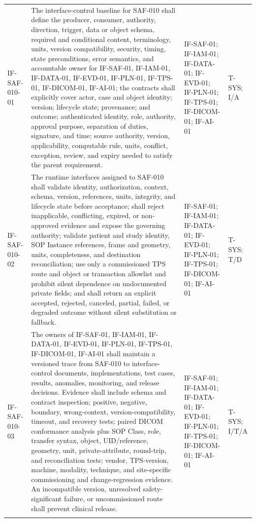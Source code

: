\documentclass[11pt,letterpaper]{article}
\begin{document}
\begin{scriptsize}
\begin{longtable}{@{}L{0.14\textwidth}L{0.49\textwidth}L{0.19\textwidth}L{0.10\textwidth}@{}}
\mbox{IF-SAF-010-01} & The interface-control baseline for SAF-010 shall define the producer, consumer, authority, direction, trigger, data or object schema, required and conditional content, terminology, units, version compatibility, security, timing, state preconditions, error semantics, and accountable owner for IF-SAF-01, IF-IAM-01, IF-DATA-01, IF-EVD-01, IF-PLN-01, IF-TPS-01, IF-DICOM-01, IF-AI-01; the contracts shall explicitly cover actor, case and object identity; version; lifecycle state; provenance; and outcome; authenticated identity, role, authority, approval purpose, separation of duties, signature, and time; source authority, version, applicability, computable rule, units, conflict, exception, review, and expiry needed to satisfy the parent requirement. & IF-SAF-01; IF-IAM-01; IF-DATA-01; IF-EVD-01; IF-PLN-01; IF-TPS-01; IF-DICOM-01; IF-AI-01 & T-SYS; I\slash\allowbreak{}A \\
\addlinespace[2pt]
\mbox{IF-SAF-010-02} & The runtime interfaces assigned to SAF-010 shall validate identity, authorization, context, schema, version, references, units, integrity, and lifecycle state before acceptance; shall reject inapplicable, conflicting, expired, or non-approved evidence and expose the governing authority; validate patient and study identity, SOP Instance references, frame and geometry, units, completeness, and destination reconciliation; use only a commissioned TPS route and object or transaction allowlist and prohibit silent dependence on undocumented private fields; and shall return an explicit accepted, rejected, canceled, partial, failed, or degraded outcome without silent substitution or fallback. & IF-SAF-01; IF-IAM-01; IF-DATA-01; IF-EVD-01; IF-PLN-01; IF-TPS-01; IF-DICOM-01; IF-AI-01 & T-SYS; T\slash\allowbreak{}D \\
\addlinespace[2pt]
\mbox{IF-SAF-010-03} & The owners of IF-SAF-01, IF-IAM-01, IF-DATA-01, IF-EVD-01, IF-PLN-01, IF-TPS-01, IF-DICOM-01, IF-AI-01 shall maintain a versioned trace from SAF-010 to interface-control documents, implementations, test cases, results, anomalies, monitoring, and release decisions. Evidence shall include schema and contract inspection; positive, negative, boundary, wrong-context, version-compatibility, timeout, and recovery tests; paired DICOM conformance analysis plus SOP Class, role, transfer syntax, object, UID\slash\allowbreak{}reference, geometry, unit, private-attribute, round-trip, and reconciliation tests; vendor, TPS-version, machine, modality, technique, and site-specific commissioning and change-regression evidence. An incompatible version, unresolved safety-significant failure, or uncommissioned route shall prevent clinical release. & IF-SAF-01; IF-IAM-01; IF-DATA-01; IF-EVD-01; IF-PLN-01; IF-TPS-01; IF-DICOM-01; IF-AI-01 & T-SYS; I\slash\allowbreak{}T\slash\allowbreak{}A \\
\addlinespace[2pt]
\end{longtable}
\end{scriptsize}
\end{document}
